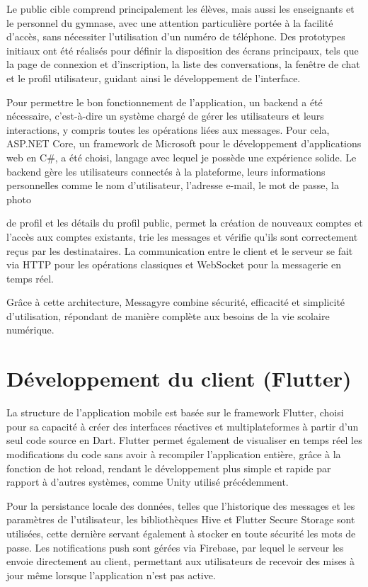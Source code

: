 \documentclass[12pt]{report}
\begin{document}
	Le public cible comprend principalement les élèves, mais aussi les enseignants et le personnel du gymnase, avec une attention particulière portée à la facilité d’accès, sans nécessiter l’utilisation d’un numéro de téléphone. Des prototypes initiaux ont été réalisés pour définir la disposition des écrans principaux, tels que la page de connexion et d’inscription, la liste des conversations, la fenêtre de chat et le profil utilisateur, guidant ainsi le développement de l’interface.
	
	Pour permettre le bon fonctionnement de l’application, un backend a été nécessaire, c’est-à-dire un système chargé de gérer les utilisateurs et leurs interactions, y compris toutes les opérations liées aux messages. Pour cela, ASP.NET Core\supercite{aspnetcore}, un framework de Microsoft pour le développement d’applications web en C\#\supercite{csharp}, a été choisi, langage avec lequel je possède une expérience solide. Le backend gère les utilisateurs connectés à la plateforme, leurs informations personnelles comme le nom d’utilisateur, l’adresse e-mail, le mot de passe, la photo 
	
	de profil et les détails du profil public, permet la création de nouveaux comptes et l’accès aux comptes existants, trie les messages et vérifie qu’ils sont correctement reçus par les destinataires. La communication entre le client et le serveur se fait via HTTP\supercite{http} pour les opérations classiques et WebSocket\supercite{websocket} pour la messagerie en temps réel.
	
	Grâce à cette architecture, Messagyre combine sécurité, efficacité et simplicité d’utilisation, répondant de manière complète aux besoins de la vie scolaire numérique.
	
	\section{Développement du client (Flutter)}
	
	La structure de l'application mobile est basée sur le framework Flutter\supercite{flutter}, choisi pour sa capacité à créer des interfaces réactives et multiplateformes à partir d'un seul code source en Dart\supercite{dart}. Flutter permet également de visualiser en temps réel les modifications du code sans avoir à recompiler l'application entière, grâce à la fonction de hot reload, rendant le développement plus simple et rapide par rapport à d'autres systèmes, comme Unity utilisé précédemment.
	
	Pour la persistance locale des données, telles que l'historique des messages et les paramètres de l'utilisateur, les bibliothèques Hive\supercite{hive} et Flutter Secure Storage\supercite{securestorage} sont utilisées, cette dernière servant également à stocker en toute sécurité les mots de passe. Les notifications push sont gérées via Firebase\supercite{firebase}, par lequel le serveur les envoie directement au client, permettant aux utilisateurs de recevoir des mises à jour même lorsque l'application n'est pas active.
	
\end{document}
